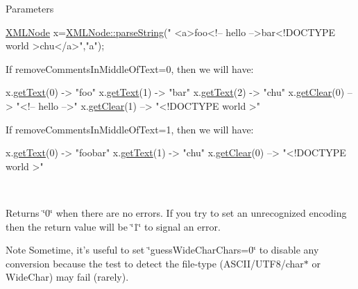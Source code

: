 \begin{DoxyParams}{Parameters}
\begin{DoxyCode}
              \hyperlink{structXMLNode}{XMLNode} x=\hyperlink{group__conversions_ga72125a4ccfae9b39bafab768346bbc7e}{XMLNode::parseString}(\textcolor{stringliteral}{"
      <a>foo<!-- hello -->bar<!DOCTYPE world >chu</a>"},\textcolor{stringliteral}{"a"});
\end{DoxyCode}
 If remove\-Comments\-In\-Middle\-Of\-Text=0, then we will have\-: 
\begin{DoxyCode}
              x.\hyperlink{group__navigate_gaeb607292b18d4615b7c169c7c08c0a8b}{getText}(0) -> \textcolor{stringliteral}{"foo"}
              x.\hyperlink{group__navigate_gaeb607292b18d4615b7c169c7c08c0a8b}{getText}(1) -> \textcolor{stringliteral}{"bar"}
              x.\hyperlink{group__navigate_gaeb607292b18d4615b7c169c7c08c0a8b}{getText}(2) -> \textcolor{stringliteral}{"chu"}
              x.\hyperlink{group__navigate_gab99fbcb5534ab2194889c4802e290354}{getClear}(0) --> \textcolor{stringliteral}{"<!-- hello -->"}
              x.\hyperlink{group__navigate_gab99fbcb5534ab2194889c4802e290354}{getClear}(1) --> \textcolor{stringliteral}{"<!DOCTYPE world >"}
\end{DoxyCode}
 If remove\-Comments\-In\-Middle\-Of\-Text=1, then we will have\-: 
\begin{DoxyCode}
              x.\hyperlink{group__navigate_gaeb607292b18d4615b7c169c7c08c0a8b}{getText}(0) -> \textcolor{stringliteral}{"foobar"}
              x.\hyperlink{group__navigate_gaeb607292b18d4615b7c169c7c08c0a8b}{getText}(1) -> \textcolor{stringliteral}{"chu"}
              x.\hyperlink{group__navigate_gab99fbcb5534ab2194889c4802e290354}{getClear}(0) --> \textcolor{stringliteral}{"<!DOCTYPE world >"}
\end{DoxyCode}
\\
\hline
\end{DoxyParams}
\begin{DoxyReturn}{Returns}
\char`\"{}0\char`\"{} when there are no errors. If you try to set an unrecognized encoding then the return value will be \char`\"{}1\char`\"{} to signal an error.
\end{DoxyReturn}
\begin{DoxyNote}{Note}
Sometime, it's useful to set \char`\"{}guess\-Wide\-Char\-Chars=0\char`\"{} to disable any conversion because the test to detect the file-\/type (A\-S\-C\-I\-I/\-U\-T\-F8/char$\ast$ or Wide\-Char) may fail (rarely). 
\end{DoxyNote}
